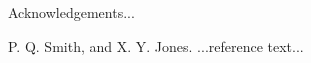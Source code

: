 \documentclass{sigplanconf}
\begin{document}




\acks

Acknowledgements...





\begin{thebibliography}{}
\softraggedright

P. Q. Smith, and X. Y. Jones. ...reference text...

\end{thebibliography}
\end{document}
